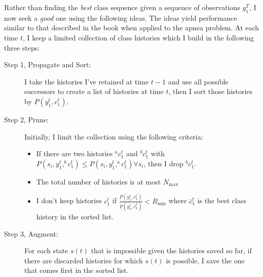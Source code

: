 \documentclass[prelim,showlabels]{book}
\begin{document}
Rather than finding the \emph{best} class sequence given a sequence of
observations $y_1^T$, I now seek a \emph{good} one using the following
ideas.  The ideas yield performance similar to that described in the
book when applied to the apnea problem.  At each time $t$, I keep a
limited collection of class histories which I build in the following
three steps:
\begin{description}
\item[Step 1, Propagate and Sort:] I take the histories I've retained
  at time $t-1$ and use all possible successors to create a list of
  histories at time $t$, then I sort those histories by
  $P(y_1^{t},c_1^{t})$.
\item[Step 2, Prune:] Initially, I limit the collection using the
  following criteria:
  \begin{itemize}
  \item If there are two histories $^ac_1^t$ and $^bc_1^t$ with
    $P(s_i, y_1^{t}, ^bc_1^{t}) \leq P(s_i, y_1^{t}, ^ac_1^{t})
    \forall s_i $, then I drop $^bc_1^t$.
  \item The total number of histories is at most $N_{\text{max}}$
  \item I don't keep histories $c_1^t$ if
    $\frac{P(y_1^{t},c_1^{t})}{P(y_1^{t},\bar c_1^{t})} <
    R_{\text{min}}$ where $\bar c_1^t$ is the best class history in
    the sorted list.
  \end{itemize}
\item[Step 3, Augment:] For each state $s(t)$ that is impossible given
  the histories saved so far, if there are discarded histories for
  which $s(t)$ is possible, I save the one that comes first in the
  sorted list.
\end{description}
\end{document}
